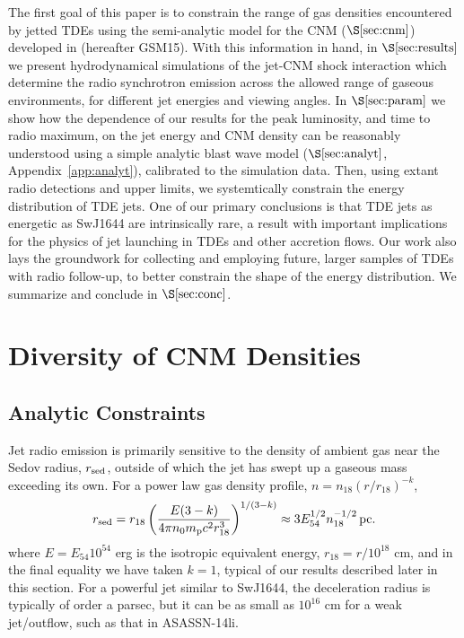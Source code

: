 \documentclass[usenatbib,fleqn]{mnras}
\begin{document}
The first goal of this paper is to constrain the range of gas
densities encountered by jetted TDEs using the semi-analytic model for
the CNM ($\S\ref{sec:cnm}$) developed in \citet{Generozov+2015}
(hereafter GSM15).  With this information in hand, in
$\S\ref{sec:results}$ we present hydrodynamical simulations of the
jet-CNM shock interaction which determine the radio synchrotron
emission across the allowed range of gaseous environments, for
different jet energies and viewing angles.  In $\S\ref{sec:param}$ we
show how the dependence of our results for the peak luminosity, and
time to radio maximum, on the jet energy and CNM density can be
reasonably understood using a simple analytic blast wave model
($\S\ref{sec:analyt}$, Appendix~\ref{app:analyt}), calibrated to the
simulation data.  Then, using extant radio detections and upper
limits, we systemtically constrain the energy distribution of TDE
jets.  One of our primary conclusions is that TDE jets as energetic as
SwJ1644 are intrinsically rare, a result with important implications
for the physics of jet launching in TDEs and other accretion flows.
Our work also lays the groundwork for collecting and employing future,
larger samples of TDEs with radio follow-up, to better constrain the
shape of the energy distribution.  We summarize and conclude in
$\S\ref{sec:conc}$.

\section{Diversity of CNM Densities}
\label{sec:cnm}


\subsection{Analytic Constraints}
\label{sec:analy}


Jet radio emission is primarily sensitive to the density of ambient
gas near the Sedov radius, $r_{\rm sed}$, outside of which the jet has
swept up a gaseous mass exceeding its own. For a power law gas density
profile, $n= n_{18} \left(r/r_{18}\right)^{-k}$,
\begin{equation}
  r_{\rm sed} = r_{18} \left( \frac{E(3-k)}{4\pi n_{0}
      m_{\rm p} c^2 r_{18}^3} \right)^{1/(3-k)} \approx 3 E_{54}^{1/2} n_{\rm 18}^{-1/2}\,{\rm pc}. 
  \label{eq:rdec}
\end{equation}
where $E = E_{54}10^{54}$ erg is the isotropic equivalent energy,
$r_{18} = r/10^{18}$ cm, and in the final equality we have taken $k =
1$, typical of our results described later in this section.  For a
powerful jet similar to SwJ1644, the deceleration radius is typically
of order a parsec, but it can be as small as $10^{16}$ cm for a weak
jet/outflow, such as that in ASASSN-14li.
\end{document}
